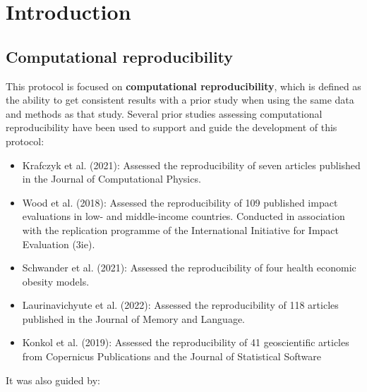 \vspace{1cm}
\section{Introduction}

\subsection{Computational reproducibility}

This protocol is focused on \textbf{computational reproducibility}, which is defined as the ability to get consistent results with a prior study when using  the same data and methods as that study.\autocite{national_academies_of_sciences_engineering_and_medicine_reproducibility_2019} Several prior studies assessing computational reproducibility have been used to support and guide the development of this protocol:

\begin{itemize}
    \item Krafczyk et al. (2021):\autocite{krafczyk_learning_2021} Assessed the reproducibility of seven articles published in the Journal of Computational Physics.
    \item Wood et al. (2018):\autocite{wood_push_2018,wood_replication_2018} Assessed the reproducibility of 109 published impact evaluations in low- and middle-income countries. Conducted in association with the replication programme of the International Initiative for Impact Evaluation (3ie).
    \item Schwander et al. (2021):\autocite{schwander_replication_2021} Assessed the reproducibility of four health economic obesity models.
    \item Laurinavichyute et al. (2022):\autocite{laurinavichyute_share_2022} Assessed the reproducibility of 118 articles published in the Journal of Memory and Language.
    \item Konkol et al. (2019):\autocite{konkol_computational_2019} Assessed the reproducibility of 41 geoscientific articles from Copernicus Publications and the Journal of Statistical Software
\end{itemize}

It was also guided by:

